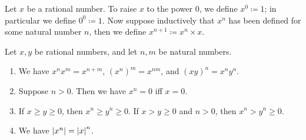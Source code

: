 \begin{defn}\label{4.3.9}
  Let \(x\) be a rational number.
  To raise \(x\) to the power \(0\), we define \(x^0 \coloneqq 1\);
  in particular we define \(0^0 \coloneqq 1\).
  Now suppose inductively that \(x^n\) has been defined for some natural number \(n\), then we define \(x^{n+1} \coloneqq x^n \times x\).
\end{defn}

\begin{prop}\label{4.3.10}
  Let \(x, y\) be rational numbers, and let \(n, m\) be natural numbers.
  \begin{enumerate}
    \item We have \(x^n x^m = x^{n + m}\), \((x^n)^m = x^{nm}\), and \((xy)^n = x^n y^n\).
    \item Suppose \(n > 0\).
          Then we have \(x^n = 0\) iff \(x = 0\).
    \item If \(x \geq y \geq 0\), then \(x^n \geq y^n \geq 0\).
          If \(x > y \geq 0\) and \(n > 0\), then \(x^n > y^n \geq 0\).
    \item We have \(\left\lvert x^n\right\rvert = \left\lvert x\right\rvert^n\).
  \end{enumerate}
\end{prop}

